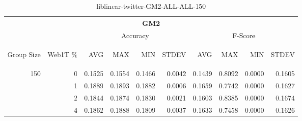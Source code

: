 \begin{center}
\begin{table}[htbp]
\begin{tabular}{ | r | r | r | r | r | r | r | r | r | r |}
\hline
\multicolumn{10}{|c|}{GM2}\\
\hline
 & & \multicolumn{4}{|c|}{Accuracy} & \multicolumn{4}{|c|}{F-Score}\\ \cline{3-10}
\begin{sideways}Group Size\end{sideways} & \begin{sideways}Web1T \%\end{sideways} & \begin{sideways}AVG\end{sideways} & \begin{sideways}MAX\end{sideways} & \begin{sideways}MIN\end{sideways} & \begin{sideways}STDEV\end{sideways} & \begin{sideways}AVG\end{sideways} & \begin{sideways}MAX\end{sideways} & \begin{sideways}MIN\end{sideways} & \begin{sideways}STDEV\end{sideways}\\
\hline
\multirow{4}{*}{150}
 & 0 & 0.1525 & 0.1554 & 0.1466 & 0.0042 & 0.1439 & 0.8092 & 0.0000 & 0.1605\\ \cline{2-10}
 & 1 & 0.1889 & 0.1893 & 0.1882 & 0.0006 & 0.1659 & 0.7742 & 0.0000 & 0.1627\\ \cline{2-10}
 & 2 & 0.1844 & 0.1874 & 0.1830 & 0.0021 & 0.1603 & 0.8385 & 0.0000 & 0.1674\\ \cline{2-10}
 & 4 & 0.1862 & 0.1888 & 0.1809 & 0.0037 & 0.1633 & 0.7458 & 0.0000 & 0.1626\\ \cline{2-10}
\hline
\end{tabular}
\caption{liblinear-twitter-GM2-ALL-ALL-150}
\end{table}
\end{center}

